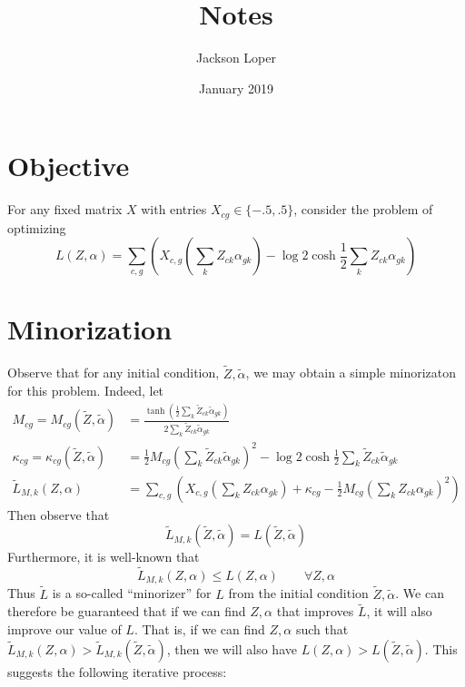 \documentclass{article}
\begin{document}
\title{Notes}

\author{Jackson Loper}

\date{January 2019}

\maketitle

\section{Objective}

For any fixed matrix $X$ with entries $X_{cg}\in \{-.5,.5\}$, consider the problem of optimizing
\[
L(Z,\alpha) = \sum_{c,g} \left(X_{c,g}\left(\sum_k Z_{ck} \alpha_{gk}\right) - \log 2 \cosh \frac{1}{2}\sum_k Z_{ck} \alpha_{gk}\right)
\]

\section{Minorization}

Observe that for any initial condition, $\tilde Z,\tilde \alpha$, we may obtain a simple minorizaton for this problem.  Indeed, let
\begin{align*}
M_{cg}=M_{cg}(\tilde Z,\tilde \alpha) &=\frac{\tanh \left(\frac{1}{2}\sum_k \tilde Z_{ck} \tilde \alpha_{gk}\right)}{2\sum_k \tilde Z_{ck} \tilde \alpha_{gk}}\\
\kappa_{cg} = \kappa_{cg}(\tilde Z,\tilde \alpha) &=  \frac{1}{2}M_{cg}\left(\sum_k \tilde Z_{ck} \tilde \alpha_{gk}\right)^2 - \log 2 \cosh \frac{1}{2}\sum_k \tilde Z_{ck} \tilde \alpha_{gk}\\
\tilde L_{M,k}(Z,\alpha) &= \sum_{c,g} \left(X_{c,g}\left(\sum_k Z_{ck} \alpha_{gk}\right) + \kappa_{cg} - \frac{1}{2}M_{cg}\left(\sum_k Z_{ck} \alpha_{gk}\right)^2 \right)
\end{align*}
Then observe that
\[
\tilde L_{M,k}(\tilde Z,\tilde \alpha) = L(\tilde Z,\tilde \alpha)
\]
Furthermore, it is well-known that
\[
\tilde L_{M,k}(Z,\alpha) \leq L(Z,\alpha) \qquad \forall Z,\alpha
\]
Thus $\tilde L$ is a so-called ``minorizer'' for $L$ from the initial condition $\tilde Z,\tilde \alpha$.  We can therefore be guaranteed that if we can find $Z,\alpha$ that improves $\tilde L$, it will also improve our value of $L$.  That is, if we can find $Z,\alpha$ such that $\tilde L_{M,k}(Z,\alpha)>\tilde L_{M,k}(\tilde Z,\tilde \alpha)$, then we will also have $L(Z,\alpha)>L(\tilde Z,\tilde \alpha)$.  This suggests the following iterative process:
\end{document}
